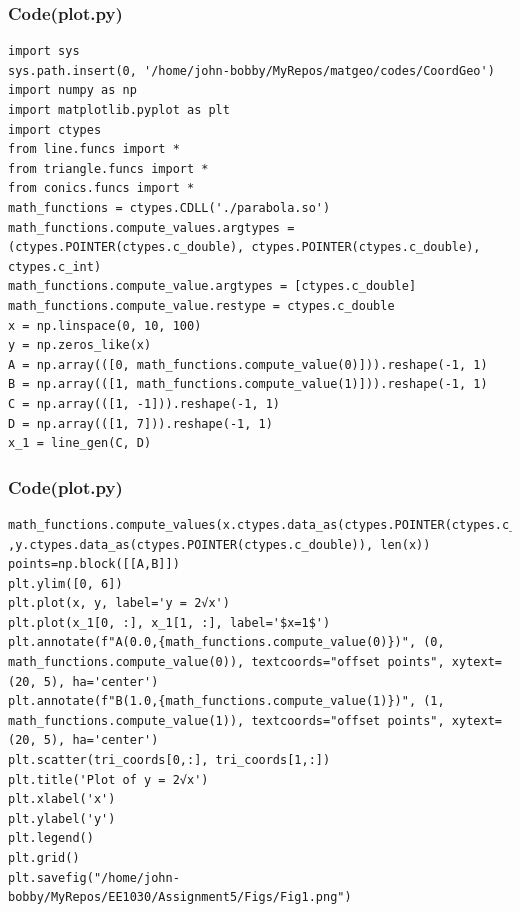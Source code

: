 \documentclass{beamer}
\begin{document}
\begin{frame}[fragile]
\frametitle{Code(plot.py)}
\begin{verbatim}
import sys                                          
sys.path.insert(0, '/home/john-bobby/MyRepos/matgeo/codes/CoordGeo') 
import numpy as np
import matplotlib.pyplot as plt
import ctypes
from line.funcs import *
from triangle.funcs import *
from conics.funcs import *
math_functions = ctypes.CDLL('./parabola.so')
math_functions.compute_values.argtypes = (ctypes.POINTER(ctypes.c_double), ctypes.POINTER(ctypes.c_double), ctypes.c_int)
math_functions.compute_value.argtypes = [ctypes.c_double]
math_functions.compute_value.restype = ctypes.c_double
x = np.linspace(0, 10, 100)  
y = np.zeros_like(x)
A = np.array(([0, math_functions.compute_value(0)])).reshape(-1, 1)
B = np.array(([1, math_functions.compute_value(1)])).reshape(-1, 1)
C = np.array(([1, -1])).reshape(-1, 1)
D = np.array(([1, 7])).reshape(-1, 1)
x_1 = line_gen(C, D)

\end{verbatim}
    
\end{frame}
\begin{frame}[fragile]
\frametitle{Code(plot.py)}
\begin{verbatim}
math_functions.compute_values(x.ctypes.data_as(ctypes.POINTER(ctypes.c_double))
,y.ctypes.data_as(ctypes.POINTER(ctypes.c_double)), len(x))
points=np.block([[A,B]])
plt.ylim([0, 6]) 
plt.plot(x, y, label='y = 2√x')
plt.plot(x_1[0, :], x_1[1, :], label='$x=1$')
plt.annotate(f"A(0.0,{math_functions.compute_value(0)})", (0, math_functions.compute_value(0)), textcoords="offset points", xytext=(20, 5), ha='center')
plt.annotate(f"B(1.0,{math_functions.compute_value(1)})", (1, math_functions.compute_value(1)), textcoords="offset points", xytext=(20, 5), ha='center')
plt.scatter(tri_coords[0,:], tri_coords[1,:])
plt.title('Plot of y = 2√x')
plt.xlabel('x')
plt.ylabel('y')
plt.legend()
plt.grid()
plt.savefig("/home/john-bobby/MyRepos/EE1030/Assignment5/Figs/Fig1.png")


\end{verbatim}    
\end{frame}
\end{document}
